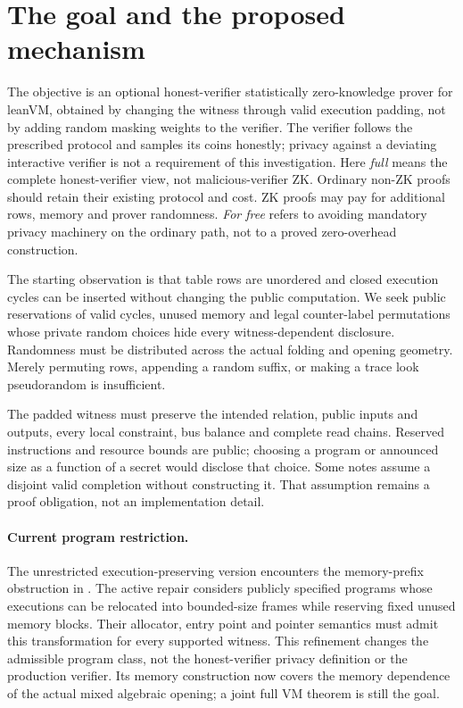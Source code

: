 \section{The goal and the proposed mechanism}\label{sec:zk-goal}\label{note:zk-padding}

The objective is an optional honest-verifier statistically zero-knowledge prover for leanVM, obtained by changing the witness through valid execution padding, not by adding random masking weights to the verifier. The verifier follows the prescribed protocol and samples its coins honestly; privacy against a deviating interactive verifier is not a requirement of this investigation. Here \emph{full} means the complete honest-verifier view, not malicious-verifier ZK. Ordinary non-ZK proofs should retain their existing protocol and cost. ZK proofs may pay for additional rows, memory and prover randomness. \emph{For free} refers to avoiding mandatory privacy machinery on the ordinary path, not to a proved zero-overhead construction.

The starting observation is that table rows are unordered and closed execution cycles can be inserted without changing the public computation. We seek public reservations of valid cycles, unused memory and legal counter-label permutations whose private random choices hide every witness-dependent disclosure. Randomness must be distributed across the actual folding and opening geometry. Merely permuting rows, appending a random suffix, or making a trace look pseudorandom is insufficient.

The padded witness must preserve the intended relation, public inputs and outputs, every local constraint, bus balance and complete read chains. Reserved instructions and resource bounds are public; choosing a program or announced size as a function of a secret would disclose that choice. Some notes assume a disjoint valid completion without constructing it. That assumption remains a proof obligation, not an implementation detail.

\paragraph{Current program restriction.} The unrestricted execution-preserving version encounters the memory-prefix obstruction in . The active repair considers publicly specified programs whose executions can be relocated into bounded-size frames while reserving fixed unused memory blocks. Their allocator, entry point and pointer semantics must admit this transformation for every supported witness. This refinement changes the admissible program class, not the honest-verifier privacy definition or the production verifier. Its memory construction now covers the memory dependence of the actual mixed algebraic opening; a joint full VM theorem is still the goal.

